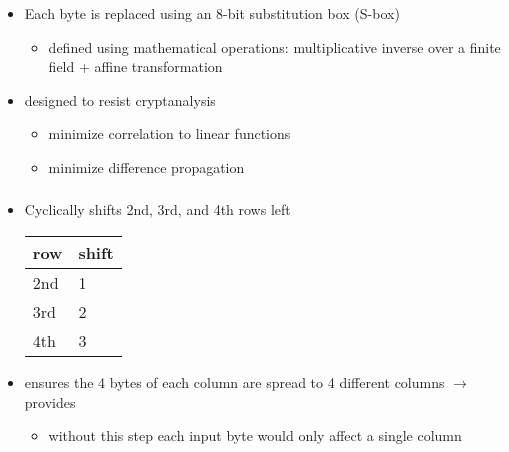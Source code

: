 \documentclass[draft]{article}
\begin{document}
\subsubsection*{}
\begin{itemize}[nosep]
    \item Each byte is replaced using an 8-bit substitution box (S-box)
          \begin{itemize}[nosep]
              \item defined using mathematical operations: multiplicative inverse over a finite field + affine transformation
          \end{itemize}
    \item designed to resist cryptanalysis
          \begin{itemize}[nosep]
              \item minimize correlation to linear functions
              \item minimize difference propagation
          \end{itemize}
\end{itemize}
\subsubsection*{}
\begin{itemize}[nosep]
    \item Cyclically shifts 2nd, 3rd, and 4th rows left

          \begin{tabular}{ll}
              row & shift \\\toprule
              2nd & 1     \\
              3rd & 2     \\
              4th & 3     \\\bottomrule
          \end{tabular}
    \item ensures the 4 bytes of each column are spread to 4 different columns $\rightarrow$ provides 
          \begin{itemize}[nosep]
              \item without this step each input byte would only affect a single column
          \end{itemize}
\end{itemize}
\end{document}
